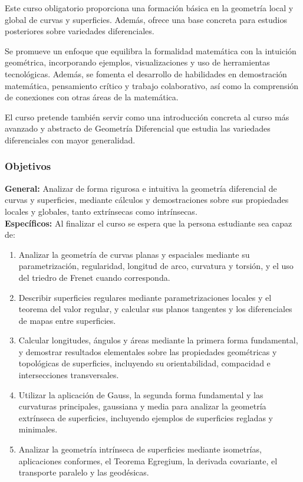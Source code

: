 \begin{refsection}
Este curso obligatorio proporciona una formación básica en la geometría local y global de curvas y superficies. Además, ofrece una base concreta para estudios posteriores sobre variedades diferenciales.

Se promueve un enfoque que equilibra la formalidad matemática con la intuición geométrica, incorporando ejemplos, visualizaciones y uso de herramientas tecnológicas. Además, se fomenta el desarrollo de habilidades en demostración matemática, pensamiento crítico y trabajo colaborativo, así como la comprensión de conexiones con otras áreas de la matemática.

El curso pretende también servir como una introducción concreta al curso más avanzado y abstracto de Geometría Diferencial que estudia las variedades diferenciales con mayor generalidad. 


\subsubsection*{Objetivos}

\textbf{General:} Analizar de forma rigurosa e intuitiva la geometría diferencial de curvas y superficies, mediante cálculos y demostraciones sobre sus propiedades locales y globales, tanto extrínsecas como intrínsecas. \\

\textbf{Específicos:}
Al finalizar el curso se espera que la persona estudiante sea capaz de:
\begin{enumerate}
  \item Analizar la geometría de curvas planas y espaciales mediante su parametrización, regularidad, longitud de arco, curvatura y torsión, y el uso del triedro de Frenet cuando corresponda.
  \item Describir superficies regulares mediante parametrizaciones locales y el teorema del valor regular, y calcular sus planos tangentes y los diferenciales de mapas entre superficies.
  \item Calcular longitudes, ángulos y áreas mediante la primera forma fundamental, y demostrar resultados elementales sobre las propiedades geométricas y topológicas de superficies, incluyendo su orientabilidad, compacidad e intersecciones transversales.
  \item Utilizar la aplicación de Gauss, la segunda forma fundamental y las curvaturas principales, gaussiana y media para analizar la geometría extrínseca de superficies, incluyendo ejemplos de superficies regladas y minimales.
  \item Analizar la geometría intrínseca de superficies mediante isometrías, aplicaciones conformes, el Teorema Egregium, la derivada covariante, el transporte paralelo y las geodésicas.
\end{enumerate}


\end{refsection}
